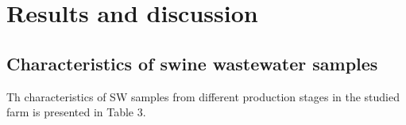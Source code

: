 \section{Results and discussion}
\subsection{Characteristics of swine wastewater samples}
Th characteristics of SW samples from different production stages in the studied farm is presented in Table 3.